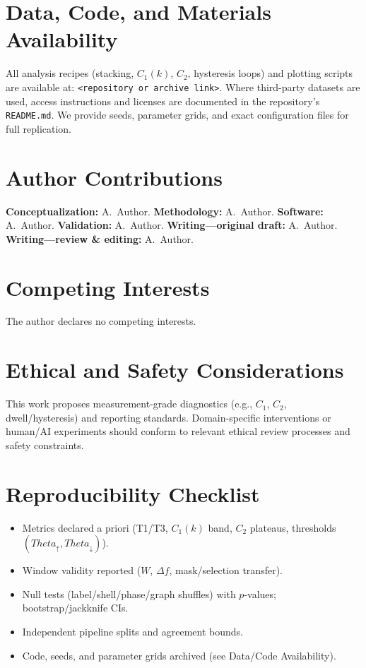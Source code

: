 \documentclass[12pt,a4paper,oneside]{scrreprt}
\def\Theta{Theta}%
\begin{document}
\chapter*{Data, Code, and Materials Availability}
All analysis recipes (stacking, $C_1(k)$, $C_2$, hysteresis loops) and plotting scripts are available at: \texttt{<repository or archive link>}. 
Where third-party datasets are used, access instructions and licenses are documented in the repository’s \texttt{README.md}. 
We provide seeds, parameter grids, and exact configuration files for full replication.

\chapter*{Author Contributions}
\textbf{Conceptualization:} A.~Author. \quad
\textbf{Methodology:} A.~Author. \quad
\textbf{Software:} A.~Author. \quad
\textbf{Validation:} A.~Author. \quad
\textbf{Writing—original draft:} A.~Author. \quad
\textbf{Writing—review \& editing:} A.~Author.

\chapter*{Competing Interests}
The author declares no competing interests.

\chapter*{Ethical and Safety Considerations}
This work proposes measurement-grade diagnostics (e.g., $C_1$, $C_2$, dwell/hysteresis) and reporting standards. 
Domain-specific interventions or human/AI experiments should conform to relevant ethical review processes and safety constraints.

\chapter*{Reproducibility Checklist}
\begin{itemize}
  \item Metrics declared a priori (T1/T3, $C_1(k)$ band, $C_2$ plateaus, thresholds $(\Theta_\uparrow,\Theta_\downarrow)$).
  \item Window validity reported ($W$, $\Delta f$, mask/selection transfer).
  \item Null tests (label/shell/phase/graph shuffles) with $p$-values; bootstrap/jackknife CIs.
  \item Independent pipeline splits and agreement bounds.
  \item Code, seeds, and parameter grids archived (see Data/Code Availability).
\end{itemize}
\end{document}
